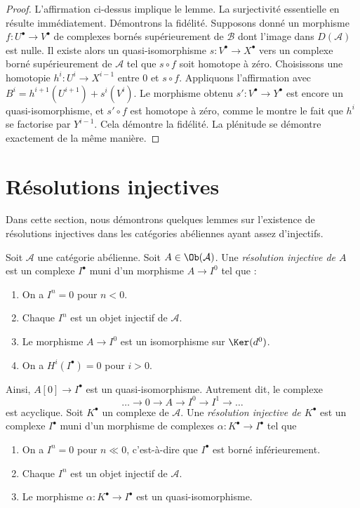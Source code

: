 \begin{proof}
\medskip\noindent
L'affirmation ci-dessus implique le lemme. La surjectivité essentielle en
résulte immédiatement. Démontrons la fidélité. Supposons donné un morphisme
$f : U^\bullet \to V^\bullet$ de complexes bornés supérieurement de
$\mathcal{B}$ dont l'image dans $D(\mathcal{A})$ est nulle. Il existe alors un
quasi-isomorphisme $s : V^\bullet \to X^\bullet$ vers un complexe borné
supérieurement de $\mathcal{A}$ tel que $s \circ f$ soit homotope à zéro.
Choisissons une homotopie $h^i : U^i \to X^{i - 1}$ entre $0$ et
$s \circ f$. Appliquons l'affirmation avec
$B^i = h^{i + 1}(U^{i + 1}) + s^i(V^i)$. Le morphisme obtenu
$s' : V^\bullet \to Y^\bullet$ est encore un quasi-isomorphisme, et
$s' \circ f$ est homotope à zéro, comme le montre le fait que $h^i$ se
factorise par $Y^{i - 1}$. Cela démontre la fidélité. La plénitude se démontre
exactement de la même manière.
\end{proof}

\section{Résolutions injectives}
\label{section-injective-resolutions}

\noindent
Dans cette section, nous démontrons quelques lemmes sur l'existence de
résolutions injectives dans les catégories abéliennes ayant assez d'injectifs.

\begin{definition}
\label{definition-injective-resolution}
Soit $\mathcal{A}$ une catégorie abélienne. Soit
$A \in \Ob(\mathcal{A})$. Une {\it résolution injective de $A$} est un
complexe $I^\bullet$ muni d'un morphisme $A \to I^0$ tel que :
\begin{enumerate}
\item On a $I^n = 0$ pour $n < 0$.
\item Chaque $I^n$ est un objet injectif de $\mathcal{A}$.
\item Le morphisme $A \to I^0$ est un isomorphisme sur $\Ker(d^0)$.
\item On a $H^i(I^\bullet) = 0$ pour $i > 0$.
\end{enumerate}
Ainsi, $A[0] \to I^\bullet$ est un quasi-isomorphisme. Autrement dit, le
complexe
$$
\ldots \to 0 \to A \to I^0 \to I^1 \to \ldots
$$
est acyclique. Soit $K^\bullet$ un complexe de $\mathcal{A}$. Une
{\it résolution injective de $K^\bullet$} est un complexe $I^\bullet$ muni
d'un morphisme de complexes $\alpha : K^\bullet \to I^\bullet$ tel que
\begin{enumerate}
\item On a $I^n = 0$ pour $n \ll 0$, c'est-à-dire que $I^\bullet$ est borné
inférieurement.
\item Chaque $I^n$ est un objet injectif de $\mathcal{A}$.
\item Le morphisme $\alpha : K^\bullet \to I^\bullet$ est un
quasi-isomorphisme.
\end{enumerate}
\end{definition}

